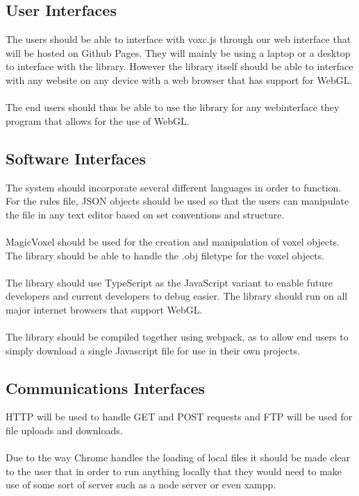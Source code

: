 \documentclass[english]{article}
\begin{document}
		\subsection{User Interfaces}
		The users should be able to interface with voxc.js through our web interface that will be hosted on Github Pages. They will mainly be using a laptop or a desktop to interface with the library. However the library itself should be able to interface with any website on any device with a web browser that has support for WebGL.
		\\\\
		The end users should thus be able to use the library for any webinterface they program that allows for the use of WebGL.
		
		\subsection{Software Interfaces}
		The system should incorporate several different languages in order to function. For the rules file, JSON objects should be 
		used so that the users can manipulate the file in any text editor based on set conventions and structure. 
		\\\\
		MagicVoxel should be used for the creation and manipulation of voxel objects. The library should be able to handle the .obj filetype for the voxel objects.
		\\\\
	 	The library should use TypeScript as the JavaScript variant to enable future developers and current developers to debug easier. The library should run on all major internet browsers that support WebGL.
	 	\\\\
	 	The library should be compiled together using webpack, as to allow end users to simply download a single Javascript file for use in their own projects.
		
		\subsection{Communications Interfaces}
		HTTP will be used to handle GET and POST requests and FTP will be used for file uploads and downloads.
		\\\\
		Due to the way Chrome handles the loading of local files it should be made clear to the user that in order to run anything locally that they would need to make use of some sort of server such as a node server or even xampp.
	\pagebreak
	
\end{document}
